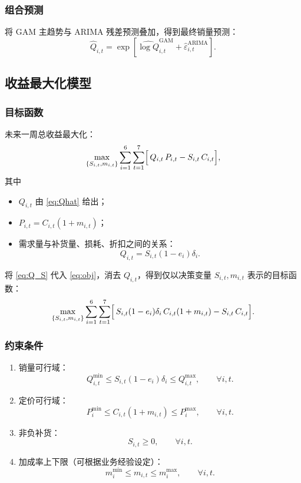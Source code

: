 \documentclass{cumcmthesis}
\begin{document}
\subsubsection{组合预测}
将 GAM 主趋势与 ARIMA 残差预测叠加，得到最终销量预测：
\begin{equation}
\widehat{Q}_{i,t} = \exp\!\left[\widehat{\log Q}_{i,t}^{\text{GAM}}
+ \widehat{\varepsilon}_{i,t}^{\text{ARIMA}}\right].
\label{eq:Qhat}
\end{equation}

\subsection{收益最大化模型}
\subsubsection{目标函数}
未来一周总收益最大化：
\begin{equation}
\max_{\{S_{i,t},m_{i,t}\}}
\sum_{i=1}^6\sum_{t=1}^7
\Bigl[\,Q_{i,t}\,P_{i,t}-S_{i,t}\,C_{i,t}\Bigr],
\label{eq:obj}
\end{equation}
其中
\begin{itemize}
\item $Q_{i,t}$ 由 \eqref{eq:Qhat} 给出；
\item $P_{i,t}=C_{i,t}(1+m_{i,t})$；
\item 需求量与补货量、损耗、折扣之间的关系：
      \begin{equation}
      Q_{i,t} = S_{i,t}(1-e_i)\delta_i.
      \label{eq:Q_S}
      \end{equation}
\end{itemize}

将 \eqref{eq:Q_S} 代入 \eqref{eq:obj}，消去 $Q_{i,t}$，得到仅以决策变量 $S_{i,t},m_{i,t}$ 表示的目标函数：
\begin{equation}
\max_{\{S_{i,t},m_{i,t}\}}
\sum_{i=1}^6\sum_{t=1}^7
\Bigl[\,S_{i,t}(1-e_i)\delta_i\,C_{i,t}(1+m_{i,t})-S_{i,t}\,C_{i,t}\Bigr].
\label{eq:obj_simp}
\end{equation}

\subsubsection{约束条件}
\begin{enumerate}
\item 销量可行域：
      \[
      Q_{i,t}^{\min} \le S_{i,t}(1-e_i)\delta_i \le Q_{i,t}^{\max},
      \qquad \forall i,t.
      \]
\item 定价可行域：
      \[
      P_{i}^{\min} \le C_{i,t}(1+m_{i,t}) \le P_{i}^{\max},
      \qquad \forall i,t.
      \]
\item 非负补货：
      \[
      S_{i,t} \ge 0,\qquad \forall i,t.
      \]
\item 加成率上下限（可根据业务经验设定）：
      \[
      m_{i}^{\min} \le m_{i,t} \le m_{i}^{\max},
      \qquad \forall i,t.
      \]
\end{enumerate}
\end{document}

